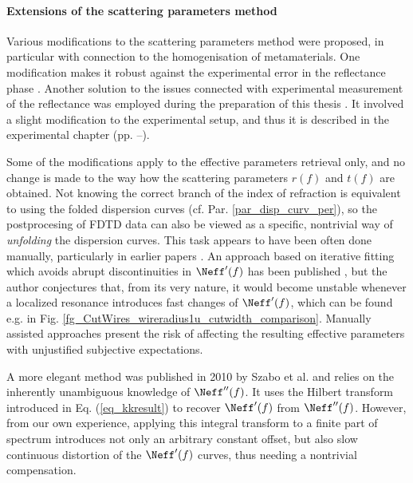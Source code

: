 \paragraph{Extensions of the scattering parameters method} 
Various modifications to the scattering parameters method were proposed, in particular with connection to the homogenisation of metamaterials. One modification makes it robust against the experimental error in the reflectance phase \cite{chalapat2009wideband}. %
Another solution to the issues connected with experimental measurement of the reflectance was employed during the preparation of this thesis \cite{nemec2012resonant}. It involved a slight modification to the experimental setup, and thus it is described in the experimental chapter (pp. \pageref{srtm}--\pageref{srtm2}).

Some of the modifications apply to the effective parameters retrieval only, and no change is made to the way how  the scattering parameters $r(f)$ and $t(f)$ are obtained.
Not knowing the correct branch of the index of refraction is equivalent to using the folded dispersion curves (cf. Par. \ref{par_disp_curv_per}), %
so the postprocesing of FDTD data can also be viewed as a specific, nontrivial way of \textit{unfolding} the dispersion curves. This task appears to have been often done manually, particularly in earlier papers \cite{smith2002determination}. An approach based on iterative fitting which avoids abrupt discontinuities in $\Neff'(f)$ has been published \cite{chen2004robust}, but the author conjectures that, from its very nature, it would become unstable whenever a localized resonance introduces fast changes of $\Neff'(f)$, which can be found e.g. in Fig. \ref{fg_CutWires_wireradius1u_cutwidth_comparison}. Manually assisted approaches present the risk of affecting the resulting effective parameters with unjustified subjective expectations.

A more elegant method was published in 2010 by Szabo et al. \cite{szabo2010unique} and relies on the inherently unambiguous knowledge of $\Neff''(f)$. It uses the Hilbert transform introduced in Eq. (\ref{eq_kkresult}) to recover $\Neff'(f)$ from $\Neff''(f)$. 
However, from our own experience, applying this integral transform to a finite part of spectrum introduces not only an arbitrary constant offset, but also slow continuous distortion of the $\Neff'(f)$ curves, thus needing a nontrivial compensation.

